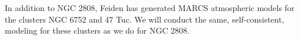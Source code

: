 In addition to NGC 2808, Feiden has generated MARCS atmospheric models for 
the clusters NGC 6752 and 47 Tuc. We will conduct the same, self-consistent, 
modeling for these clusters as we do for NGC 2808.
